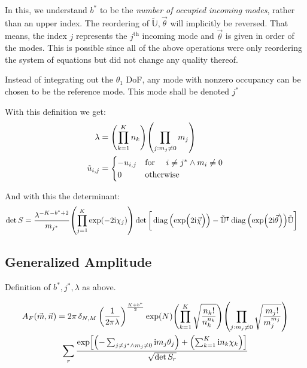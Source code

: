 \documentclass[
	english,
	a4paper,
	fontsize=10pt,
	parskip=half,
	titlepage=true,
	DIV=12,
	final
]{scrreprt}
\newcommand*{\transp}{\ensuremath{^\intercal}}
\newcommand*{\iunit}{\ensuremath{\mathrm{i}}}
\DeclareMathOperator{\diag}{diag}
\begin{document}
In this, we understand $b^*$ to be the \emph{number of occupied incoming modes}, rather than an upper index. The reordering of $\tilde{\mathbb{U}}, \vec{\theta}$ will implicitly be reversed. That means, the index $j$ represents the $j^{\text{th}}$ incoming mode and $\vec{\theta}$ is given in order of the modes. This is possible since all of the above operations were only reordering the system of equations but did not change any quality thereof.

Instead of integrating out the $\theta_1$ DoF, any mode with nonzero occupancy can be chosen to be the reference mode. This mode shall be denoted $j^*$

With this definition we get:
\begin{align}
	\lambda
&=
	\qty( \prod_{k=1}^{K}   n_k )
	\qty( \prod_{j : m_j \neq 0} m_j )
\label{eqn:DefLambdaNonBZO_m}
\\
	\tilde{u}_{i,j} 
&=
	\begin{cases}
		-u_{i,j}		&\qq*{for } i \neq j^* \land m_i \neq 0 \\
		0			&\qotherwise*
	\end{cases}
\label{eqn:DefReducedDFTNonBZO_m}
\end{align}

And with this the determinant:
\begin{align}
	\det S
&=
	\frac{ \lambda^{-K - b^* + 2} }{ m_{j^*} }
	\qty( \prod_{j=1}^{K} \exp(-2\iunit \chi_j) )
	\det\qty[\bigg.
		\diag\qty(\exp(\Big.2\iunit\vec{\chi}))
		-
		\tilde{\mathbb{U}}\transp
		\diag\qty(\exp(2\iunit\vec{\theta}))
		\tilde{\mathbb{U}}
	]
\label{eqn:detSNonBZO_m}
\end{align}

\subsection{Generalized Amplitude}
Definition of $b^*, j^*, \lambda$ as above.

\begin{multline}
	A_F(\vec{m}, \vec{n})
=
	2\pi \, \delta_{N,M} \, \qty(
		\frac{1}{2\pi\lambda}
	)^{\frac{K + b^*}{2}}
	\exp(N)
	\qty( \prod_{k=1}^{K}
		\sqrt{\frac
			{ n_k! }
			{ n_k^{n_k} }
	})
	\qty( \prod_{j : m_j \neq 0}
		\sqrt{\frac
			{ m_j! }
			{ m_j^{m_j} }
	})
\\
	\sum_r
		\frac
		{\exp[
			\qty(- \sum_{j\neq j^* \land m_j \neq 0} \iunit m_j \theta_j) + 
			\qty(  \sum_{k=1}^{K}                    \iunit n_k \chi  _k)
		]}
		{\sqrt{\det S_r}}
\end{multline}
\end{document}
